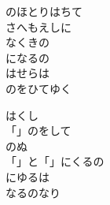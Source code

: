 \documentclass[10pt,b5j]{tarticle} %
\begin{document}
\begin{enumerate}
\begin{minipage}[c]{\blocksize}
        \vspace{\linespace}
        \item
        のほとりはちて\\
        さへもえしに\\
        なくきの\\
        になるの\\
        はせらは\\
        のをひてゆく
        
        \vspace{\linespace}
        \item
        はくし\\
        「」のをして\\
        のぬ\\
        「」と「」にくるの\\
        にゆるは\\
        なるのなり
    
    \end{minipage}
\end{enumerate} %
\end{document}
